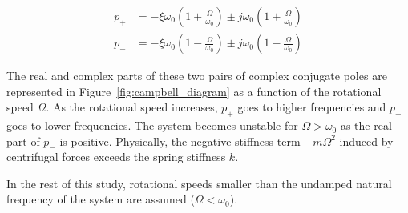 \documentclass[10pt]{iopart}
\begin{document}
\begin{subequations}
\label{eq:pole_values}
  \begin{align}
    p_{+} &= - \xi \omega_0 \left( 1 + \frac{\Omega}{\omega_0} \right) \pm j \omega_0 \left( 1 + \frac{\Omega}{\omega_0} \right) \\
    p_{-} &= - \xi \omega_0 \left( 1 - \frac{\Omega}{\omega_0} \right) \pm j \omega_0 \left( 1 - \frac{\Omega}{\omega_0} \right)
  \end{align}
\end{subequations}

The real and complex parts of these two pairs of complex conjugate poles are represented in Figure~\ref{fig:campbell_diagram} as a function of the rotational speed \(\Omega\).
As the rotational speed increases, \(p_{+}\) goes to higher frequencies and \(p_{-}\) goes to lower frequencies.
The system becomes unstable for \(\Omega > \omega_0\) as the real part of \(p_{-}\) is positive.
Physically, the negative stiffness term \(-m\Omega^2\) induced by centrifugal forces exceeds the spring stiffness \(k\).

In the rest of this study, rotational speeds smaller than the undamped natural frequency of the system are assumed (\(\Omega < \omega_0\)).
\end{document}
